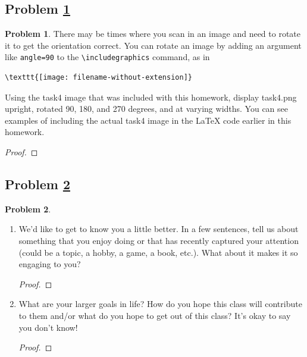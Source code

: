 \documentclass[11pt]{article}
\theoremstyle{definition}
\theoremstyle{definition}
\newtheorem{required}{Problem}
\theoremstyle{definition}
\begin{document}
\subsection{Problem \ref{RotateImage}}
\begin{required} \label{RotateImage}
There may be times where you scan in an image and need to rotate it to get the orientation correct. You can rotate an image by adding an argument like \texttt{angle=90} to the \texttt{\textbackslash includegraphics} command, as in
\begin{verbatim}
\texttt{[image: filename-without-extension]}
\end{verbatim}

Using the task4 image that was included with this homework, display task4.png upright, rotated 90, 180, and 270 degrees, and at varying widths. You can see examples of including the actual task4 image in the LaTeX code earlier in this homework.

\begin{proof}
\end{proof}

\end{required}

\newpage
\subsection{Problem \ref{Math}}
\begin{required} \label{Math}

\renewcommand{\theenumi}{\alph{enumi}}
\begin{enumerate}

\item We'd like to get to know you a little better. In a few sentences, tell us about something that you enjoy doing or that has recently captured your attention (could be a topic, a hobby, a game, a book, etc.). What about it makes it so engaging to you?

\begin{proof}
\end{proof}

\item What are your larger goals in life? How do you hope this class will contribute to them and/or what do you hope to get out of this class? It's okay to say you don't know! 

\begin{proof}
\end{proof}
\end{enumerate}

\end{required}

\end{document}
